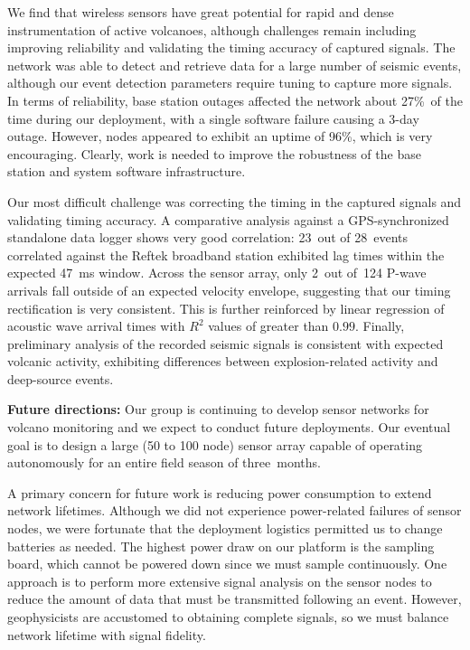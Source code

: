 We find that wireless sensors have great potential for rapid and dense
instrumentation of active volcanoes, although challenges remain including
improving reliability and validating the timing accuracy of captured signals.
The network was able to detect and retrieve data for a large number of
seismic events, although our event detection parameters require tuning to
capture more signals.
In terms of reliability, base station outages affected the network about
27\%~of the time during our deployment, with a single software failure
causing a 3-day outage. However, nodes appeared to exhibit an uptime of 96\%,
which is very encouraging. Clearly, work is needed to improve the robustness
of the base station and system software infrastructure.


Our most difficult challenge was correcting the timing in the captured
signals and validating timing accuracy. A comparative analysis against a
GPS-synchronized standalone data logger shows very good correlation: 23~out
of 28~events correlated against the Reftek broadband station exhibited lag
times within the expected 47~ms window.  Across the sensor array, only 2~out
of~124 P-wave arrivals fall outside of an expected velocity envelope,
suggesting that our timing rectification is very consistent.  This is further
reinforced by linear regression of acoustic wave arrival times with $R^2$
values of greater than $0.99$.  Finally, preliminary analysis of the recorded
seismic signals is consistent with expected volcanic activity, exhibiting
differences between explosion-related activity and deep-source events.

{\bf Future directions:} Our group is continuing to develop sensor networks
for volcano monitoring and we expect to conduct future deployments. Our
eventual goal is to design a large (50 to 100 node) sensor array capable of
operating autonomously for an entire field season of three~months.

A primary concern for future work is reducing power consumption to extend
network lifetimes. Although we did not experience power-related failures of
sensor nodes, we were fortunate that the deployment logistics permitted us to
change batteries as needed. The highest power draw on our platform is the
sampling board, which cannot be powered down since we must sample
continuously. One approach is to perform more extensive signal analysis on
the sensor nodes to reduce the amount of data that must be transmitted
following an event. However, geophysicists are accustomed to obtaining
complete signals, so we must balance network lifetime with signal fidelity. 


